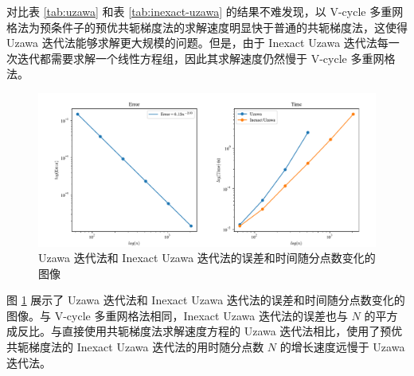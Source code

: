 \documentclass{article}
\begin{document}
\begin{table}[H]
    \centering
    \caption{Inexact Uzawa 迭代法的数值结果}
    \label{tab:inexact-uzawa}
\end{table}

对比表 \ref{tab:uzawa} 和表 \ref{tab:inexact-uzawa} 的结果不难发现，以 V-cycle 多重网格法为预条件子的预优共轭梯度法的求解速度明显快于普通的共轭梯度法，这使得 Uzawa 迭代法能够求解更大规模的问题。但是，由于 Inexact Uzawa 迭代法每一次迭代都需要求解一个线性方程组，因此其求解速度仍然慢于 V-cycle 多重网格法。

\begin{figure}[H]
    \centering
    \includegraphics[width=\textwidth]{fig/uzawa.pdf}
    \caption{Uzawa 迭代法和 Inexact Uzawa 迭代法的误差和时间随分点数变化的图像}
    \label{fig:uzawa}
\end{figure}

图 \ref{fig:uzawa} 展示了 Uzawa 迭代法和 Inexact Uzawa 迭代法的误差和时间随分点数变化的图像。与 V-cycle 多重网格法相同，Inexact Uzawa 迭代法的误差也与 $N$ 的平方成反比。与直接使用共轭梯度法求解速度方程的 Uzawa 迭代法相比，使用了预优共轭梯度法的 Inexact Uzawa 迭代法的用时随分点数 $N$ 的增长速度远慢于 Uzawa 迭代法。
\end{document}
